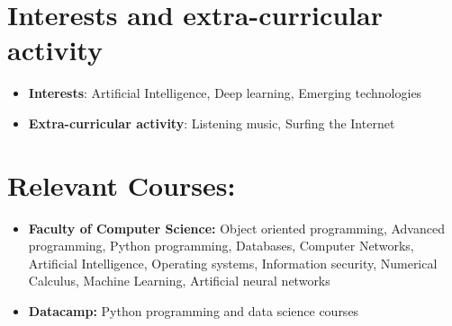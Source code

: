 \documentclass[10pt,a4paper,sans]{moderncv}
\begin{document}
	\section{Interests and extra-curricular activity}
		\begin{itemize}
			\vspace{5pt}
			\item \textbf{Interests}: Artificial Intelligence, Deep learning, Emerging technologies
			\vspace{2pt}
			\item \textbf{Extra-curricular activity}: Listening music, Surfing the Internet
		\end{itemize}
	
	\section{Relevant Courses:}
		\begin{itemize}
			\vspace{5pt}
			\item \textbf{Faculty of Computer Science: }Object oriented programming, Advanced programming, Python programming, Databases, Computer Networks, 
			Artificial Intelligence, Operating systems, Information security, Numerical Calculus, Machine Learning, Artificial neural networks
			\vspace{5pt}
			\item \textbf{Datacamp: }Python programming and data science courses
		\end{itemize}
	
	\clearpage
\end{document}

